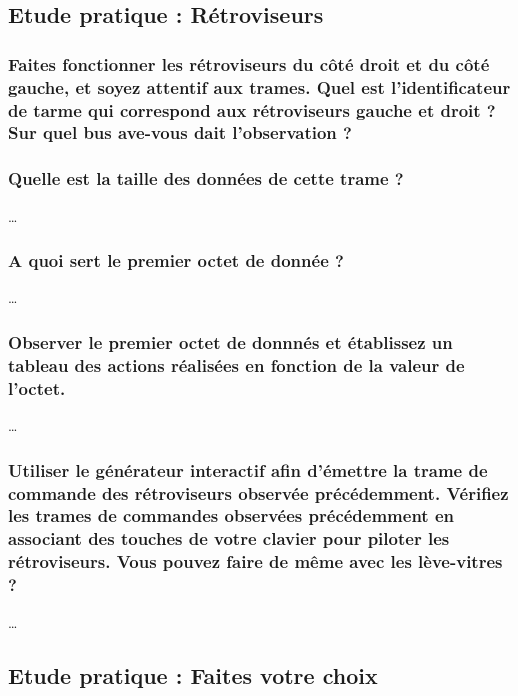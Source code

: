 \documentclass{rapportECC}
\begin{document}
\subsection{Etude pratique : Rétroviseurs}

\subsubsection*{Faites fonctionner les rétroviseurs du côté droit et du côté gauche, et soyez attentif aux trames. Quel est l'identificateur de tarme qui correspond aux rétroviseurs gauche et droit ?  Sur quel bus ave-vous dait l'observation ?}

\subsubsection*{Quelle est la taille des données de cette trame ?}

\dots

\subsubsection*{A quoi sert le premier octet de donnée ?}

\dots

\subsubsection*{Observer le premier octet de donnnés et établissez un tableau des actions  réalisées en fonction de la valeur de l'octet.}

\dots

\subsubsection*{Utiliser le générateur interactif afin d'émettre la trame de commande des rétroviseurs observée précédemment. Vérifiez les trames de commandes observées précédemment en associant des touches de votre clavier pour piloter les rétroviseurs. Vous pouvez faire de même avec les lève-vitres ?}

\dots


\subsection{Etude pratique : Faites votre choix}
\end{document}

